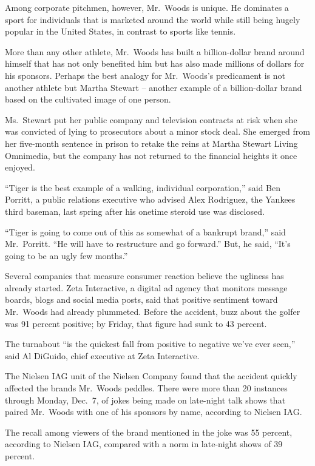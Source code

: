 ﻿\documentclass[12pt]{article}
\begin{document}
Among corporate pitchmen, however, Mr.~Woods is unique. He dominates a sport for individuals that is
marketed around the world while still being hugely popular in the United States, in contrast to
sports like tennis.

More than any other athlete, Mr.~Woods has built a billion-dollar brand around himself that has not
only benefited him but has also made millions of dollars for his sponsors. Perhaps the best analogy
for Mr.~Woods's predicament is not another athlete but Martha Stewart -- another example of a
billion-dollar brand based on the cultivated image of one person.

Ms.~Stewart put her public company and television contracts at risk when she was convicted of lying
to prosecutors about a minor stock deal. She emerged from her five-month sentence in prison to
retake the reins at Martha Stewart Living Omnimedia, but the company has not returned to the
financial heights it once enjoyed.

``Tiger is the best example of a walking, individual corporation,'' said Ben Porritt, a public
relations executive who advised Alex Rodriguez, the Yankees third baseman, last spring after his
onetime steroid use was disclosed.

``Tiger is going to come out of this as somewhat of a bankrupt brand,'' said Mr.~Porritt. ``He will
have to restructure and go forward.'' But, he said, ``It's going to be an ugly few months.''

Several companies that measure consumer reaction believe the ugliness has already started. Zeta
Interactive, a digital ad agency that monitors message boards, blogs and social media posts, said
that positive sentiment toward Mr.~Woods had already plummeted. Before the accident, buzz about the
golfer was 91 percent positive; by Friday, that figure had sunk to 43 percent.

The turnabout ``is the quickest fall from positive to negative we've ever seen,'' said Al DiGuido,
chief executive at Zeta Interactive.

The Nielsen IAG unit of the Nielsen Company found that the accident quickly affected the brands
Mr.~Woods peddles. There were more than 20 instances through Monday, Dec.~7, of jokes being made on
late-night talk shows that paired Mr.~Woods with one of his sponsors by name, according to Nielsen
IAG.

The recall among viewers of the brand mentioned in the joke was 55 percent, according to Nielsen
IAG, compared with a norm in late-night shows of 39 percent.
\end{document}
